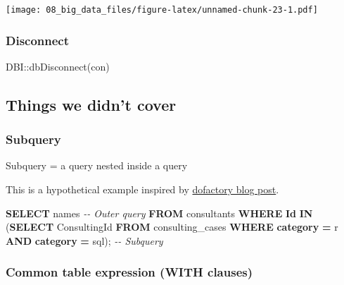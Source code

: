 \documentclass[
]{book}
\newenvironment{Shaded}{\begin{snugshade}}{\end{snugshade}}
\newcommand{\CommentTok}[1]{\textcolor[rgb]{0.56,0.35,0.01}{\textit{#1}}}
\newcommand{\FunctionTok}[1]{\textcolor[rgb]{0.00,0.00,0.00}{#1}}
\newcommand{\KeywordTok}[1]{\textcolor[rgb]{0.13,0.29,0.53}{\textbf{#1}}}
\newcommand{\NormalTok}[1]{#1}
\newcommand{\OperatorTok}[1]{\textcolor[rgb]{0.81,0.36,0.00}{\textbf{#1}}}
\newcommand{\SpecialCharTok}[1]{\textcolor[rgb]{0.00,0.00,0.00}{#1}}
\newcommand{\StringTok}[1]{\textcolor[rgb]{0.31,0.60,0.02}{#1}}
\begin{document}
\texttt{[image: 08\_big\_data\_files/figure-latex/unnamed-chunk-23-1.pdf]}

\hypertarget{disconnect}{%
\subsubsection{Disconnect}\label{disconnect}}

\begin{Shaded}
\begin{Highlighting}[]
\NormalTok{DBI}\SpecialCharTok{::}\FunctionTok{dbDisconnect}\NormalTok{(con)}
\end{Highlighting}
\end{Shaded}

\hypertarget{things-we-didnt-cover}{%
\subsection{Things we didn't cover}\label{things-we-didnt-cover}}

\hypertarget{subquery}{%
\subsubsection{Subquery}\label{subquery}}

Subquery = a query nested inside a query

This is a hypothetical example inspired by \href{https://www.dofactory.com/sql/subquery}{dofactory blog post}.

\begin{Shaded}
\begin{Highlighting}[]
\KeywordTok{SELECT}\NormalTok{ names  }\CommentTok{{-}{-} Outer query }
\KeywordTok{FROM}\NormalTok{ consultants}
\KeywordTok{WHERE} \KeywordTok{Id} \KeywordTok{IN}\NormalTok{ (}\KeywordTok{SELECT}\NormalTok{ ConsultingId}
                \KeywordTok{FROM}\NormalTok{ consulting\_cases }
                \KeywordTok{WHERE} \KeywordTok{category} \OperatorTok{=} \StringTok{\textquotesingle{}r\textquotesingle{}} \KeywordTok{AND} \KeywordTok{category} \OperatorTok{=} \StringTok{\textquotesingle{}sql\textquotesingle{}}\NormalTok{); }\CommentTok{{-}{-} Subquery }
\end{Highlighting}
\end{Shaded}

\hypertarget{common-table-expression-with-clauses}{%
\subsubsection{Common table expression (WITH clauses)}\label{common-table-expression-with-clauses}}
\end{document}
